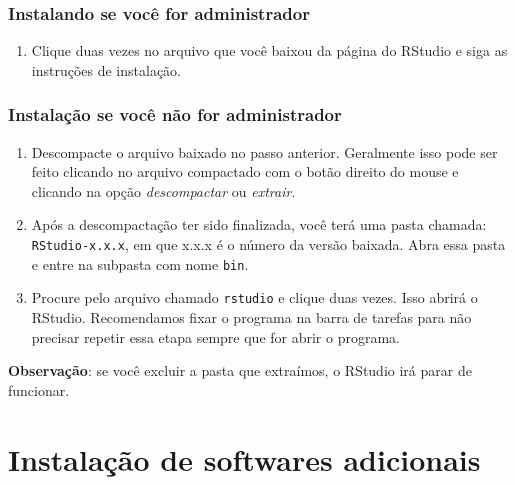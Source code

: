 \documentclass[
]{book}
\providecommand{\tightlist}{%
  \setlength{\itemsep}{0pt}\setlength{\parskip}{0pt}}
\begin{document}
\hypertarget{instalando-se-vocuxea-for-administrador}{%
\subsubsection*{Instalando se você for administrador}\label{instalando-se-vocuxea-for-administrador}}

\begin{enumerate}
\def\labelenumi{\arabic{enumi}.}
\setcounter{enumi}{1}
\tightlist
\item
  Clique duas vezes no arquivo que você baixou da página do RStudio e siga as instruções de instalação.
\end{enumerate}

\hypertarget{instalauxe7uxe3o-se-vocuxea-nuxe3o-for-administrador}{%
\subsubsection*{Instalação se você não for administrador}\label{instalauxe7uxe3o-se-vocuxea-nuxe3o-for-administrador}}

\begin{enumerate}
\def\labelenumi{\arabic{enumi}.}
\setcounter{enumi}{1}
\item
  Descompacte o arquivo baixado no passo anterior. Geralmente isso pode ser feito clicando no arquivo compactado com o botão direito do mouse e clicando na opção \emph{descompactar} ou \emph{extrair}.
\item
  Após a descompactação ter sido finalizada, você terá uma pasta chamada: \texttt{RStudio-x.x.x}, em que x.x.x é o número da versão baixada. Abra essa pasta e entre na subpasta com nome \texttt{bin}.
\item
  Procure pelo arquivo chamado \texttt{rstudio} e clique duas vezes. Isso abrirá o RStudio. Recomendamos fixar o programa na barra de tarefas para não precisar repetir essa etapa sempre que for abrir o programa.
\end{enumerate}

\textbf{Observação}: se você excluir a pasta que extraímos, o RStudio irá parar de funcionar.

\hypertarget{instalacao-adicionais}{%
\section{Instalação de softwares adicionais}\label{instalacao-adicionais}}
\end{document}
